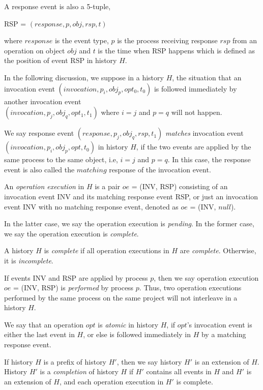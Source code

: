 A response event is also a 5-tuple,
\begin{center}
RSP = $(response, p, obj, rsp, t)$
\end{center}
where $response$ is the event type, $p$ is the process receiving response $rsp$ from an operation on object $obj$ and $t$
is the time when RSP happens which is defined as the position of event RSP in history $H$.

In the following discussion, we suppose in a history $H$, the situation that an invocation event
$(invocation, p_i, obj_p, opt_0, t_0)$ is followed immediately by another invocation event\\
$(invocation, p_j, obj_q, opt_1, t_1)$ where $i = j$ and $p = q$ will not happen.

We say response event $(response, p_j, obj_q, rsp, t_1)$ \emph{matches} invocation event\\
$(invocation, p_i, obj_p, opt, t_0)$
in history $H$, if the two events are applied by the same process to the same object, i.e, $i = j$ and $p = q$.
In this case, the response event is also called the $matching$ response of the invocation event.

An \emph{operation execution} in $H$ is a pair $oe$ = (INV, RSP) consisting of an invocation event INV
and its matching response event RSP, or just an invocation event INV with no matching response event,
denoted as $oe$ = (INV, $null$).

In the latter case, we say the operation execution is \emph{pending}. In the former case, we say the operation
execution is \emph{complete}.

A history $H$ is \emph{complete} if all operation executions in $H$ are \emph{complete}.
Otherwise, it is \emph{incomplete}.

If events INV and RSP are applied by process $p$, then we say
operation execution $oe$ = (INV, RSP) is \emph{performed} by process $p$. Thus, two operation
executions performed by the same process on the same project will not interleave in a history $H$.

We say that an operation $opt$ is \emph{atomic} in history $H$, if $opt$'s invocation event is either the last event in
$H$, or else is followed immediately in $H$ by a matching response event.

If history $H$ is a prefix of history $H'$, then we say history $H'$ is an extension of $H$.
History $H'$ is a \emph{completion} of history $H$ if $H'$ contains all events in $H$ and
$H'$ is an extension of $H$, and each operation execution in $H'$ is complete.

